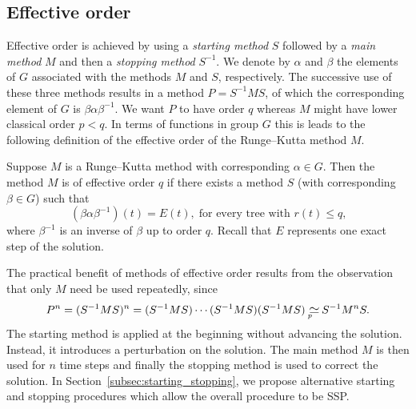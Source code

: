 \subsection{Effective order}\label{sec:Effective_order}
Effective order is achieved by using a \emph{starting method} $S$
followed by a \emph{main method} $M$
and then a \emph{stopping method} $S^{-1}$.
We denote by $\alpha$ and $\beta$ the elements of $G$ associated with the methods $M$ and $S$, respectively.
The successive use of these three methods results in a method $P = S^{-1}MS$, of which the corresponding element of $G$ is $\beta\alpha\beta^{-1}$.
We want $P$ to have order $q$ whereas $M$ might have lower classical
order $p < q$.
In terms of functions in group $G$ this is leads to the following definition of the effective order of the Runge--Kutta method $M$.
\begin{definition}\cite{Butcher1987_book}\label{def:Effective_order}
  Suppose $M$ is a Runge--Kutta method with corresponding $\alpha \in G$.
  Then the method $M$ is of effective order $q$ if there exists a method
  $S$ (with corresponding $\beta \in G$) such that
	\begin{equation}\label{eq:Effective_order_1}
		(\beta\alpha\beta^{-1})(t) = E(t), \; \text{for every tree with $r(t) \leq q$,}
	\end{equation}
        where $\beta^{-1}$ is an inverse of $\beta$ up to order $q$.
        Recall that $E$ represents one exact step of the solution.
\end{definition}
The practical benefit of methods of effective order results from the
observation that only $M$ need be used repeatedly, since
\begin{displaymath}
	P^n = (S^{-1}MS)^n = (S^{-1}MS) \cdots (S^{-1}MS) (S^{-1}MS) \equival S^{-1} M^n S.
\end{displaymath}
The starting method is applied at the beginning without advancing the
solution.
Instead, it introduces a perturbation on the solution.
The main method  $M$ is then used for $n$ time steps and finally the
stopping method is used to correct the solution.
In Section~\ref{subsec:starting_stopping}, we propose alternative
starting and stopping procedures which allow the overall procedure to
be SSP.

